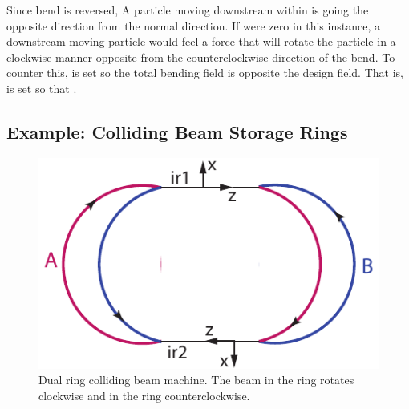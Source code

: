 Since bend  is reversed, A particle moving downstream within
 is going the opposite direction from the normal direction. If
 were zero in this instance, a downstream moving particle
would feel a force that will rotate the particle in a clockwise manner
opposite from the counterclockwise direction of the bend. To counter
this,  is set so the total bending field  is opposite the design field. That is,  is set so
that .

\subsection{Example: Colliding Beam Storage Rings}
\label{s:ex.collide}

\begin{figure}[tb]
  \centering
  \includegraphics[width=5in]{colliding-beams.pdf}
  \caption[Dual ring colliding beam machine]{Dual ring colliding beam machine. 
The beam in the  ring rotates clockwise and in the  ring
counterclockwise.}
  \label{f:collide}
\end{figure}

